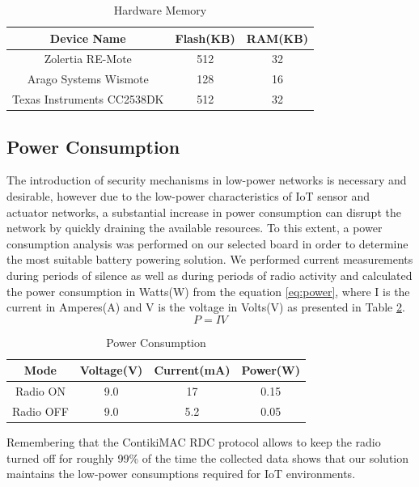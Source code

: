 \documentclass{sig-alternate-05-2015}
\begin{document}
\begin{table}
\centering
\caption{Hardware Memory}
\label{tab:hardware_memory}
\begin{tabular}{|c|c|c|} \hline
Device Name&Flash(KB)&RAM(KB)\\ \hline
Zolertia RE-Mote& 512& 32\\ \hline
Arago Systems Wismote& 128& 16\\ \hline
Texas Instruments CC2538DK& 512 & 32\\
\hline\end{tabular}
\end{table}

\subsection{Power Consumption}
The introduction of security mechanisms in low-power networks is necessary and desirable, however due to the low-power characteristics of \gls{IoT} sensor and actuator networks, a substantial increase in power consumption can disrupt the network by quickly draining the available resources. To this extent, a power consumption analysis was performed on our selected board in order to determine the most suitable battery powering solution. We performed current measurements during periods of silence as well as during periods of radio activity and calculated the power consumption in Watts(W) from the equation \ref{eq:power}, where I is the current in Amperes(A) and V is the voltage in Volts(V) as presented in Table \ref{tab:power_consumptions}.
\begin{equation}
\label{eq:power}
P = I  V
\end{equation} 

\begin{table}
\centering
\caption{Power Consumption}
\label{tab:power_consumptions}
\begin{tabular}{|c|c|c|c|} \hline
Mode&Voltage(V)&Current(mA)&Power(W)\\ \hline
Radio ON& 9.0& 17&0.15\\ \hline
Radio OFF& 9.0& 5.2&0.05\\ 
\hline\end{tabular}
\end{table}

Remembering that the ContikiMAC \gls{RDC} protocol allows to keep the radio turned off for roughly 99\% of the time\cite{Dunkels2011} the collected data shows that our solution maintains the low-power consumptions required for \gls{IoT} environments.
\end{document}
